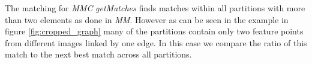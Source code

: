 \documentclass[12pt,journal,compsoc]{IEEEtran}
\begin{document}
%
The matching for \emph{MMC} \emph{getMatches} finds matches within all 
partitions with more than two elements as done in \emph{MM}. However as 
can be seen in the example in figure \ref{fig:cropped_graph} many of the 
partitions contain only two feature points from different images linked 
by one edge. In this case we compare the ratio of this match to the next 
best match across all partitions.
%
%
\end{document}
